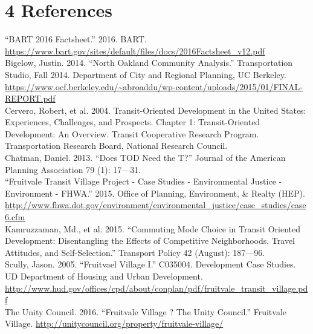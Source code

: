 \documentclass{article}
\begin{document}
\section*{4 References}

``BART 2016 Factsheet.'' 2016. BART. \url{https://www.bart.gov/sites/default/files/docs/2016Factsheet_v12.pdf} \\

\noindent
Bigelow, Justin. 2014. ``North Oakland Community Analysis.'' Transportation Studio, Fall 2014. Department of City and Regional Planning, UC Berkeley. \url{https://www.ocf.berkeley.edu/~abroaddu/wp-content/uploads/2015/01/FINAL-REPORT.pdf} \\

\noindent
Cervero, Robert, et al. 2004. Transit-Oriented Development in the United States: Experiences, Challenges, and Prospects. Chapter 1: Transit-Oriented Development: An Overview. Transit Cooperative Research Program. Transportation Research Board, National Research Council. \\

\noindent
Chatman, Daniel. 2013. ``Does TOD Need the T?'' Journal of the American Planning Association 79 (1): 17---31. \\

\noindent
``Fruitvale Transit Village Project - Case Studies - Environmental Justice - Environment - FHWA.'' 2015. Office of Planning, Environment, \& Realty (HEP). \url{http://www.fhwa.dot.gov/environment/environmental_justice/case_studies/case6.cfm} \\

\noindent
Kamruzzaman, Md., et al. 2015. ``Commuting Mode Choice in Transit Oriented Development: Disentangling the Effects of Competitive Neighborhoods, Travel Attitudes, and Self-Selection.'' Transport Policy 42 (August): 187---96. \\

\noindent
Scully, Jason. 2005. ``Fruitvael Village I.'' C035004. Development Case Studies. UD Department of Housing and Urban Development. \url{http://www.hud.gov/offices/cpd/about/conplan/pdf/fruitvale_transit_village.pdf} \\

\noindent
The Unity Council. 2016. ``Fruitvale Village ? The Unity Council.'' Fruitvale Village. \url{http://unitycouncil.org/property/fruitvale-village/}






%
\end{document}
